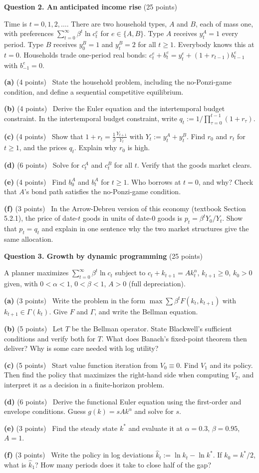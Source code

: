\documentclass[12pt]{article}
\newcommand{\gap}[1]{\par\vspace{#1}}
\newcommand{\qp}[2]{\par\medskip\textbf{(#1)} (#2 points)\ }
\begin{document}
\gap{6.0cm}
\newpage
\textbf{Question 2. An anticipated income rise} (25 points)

Time is $t=0,1,2,\dots$. There are two household types, $A$ and $B$, each
of mass one, with preferences $\sum_{t=0}^\infty\beta^t\ln c^e_t$ for
$e\in\{A,B\}$. Type $A$ receives $y^A_t=1$ every period. Type $B$ receives
$y^B_0=1$ and $y^B_t=2$ for all $t\ge1$. Everybody knows this at $t=0$.
Households trade one-period real bonds: $c^e_t+b^e_t=y^e_t+(1+r_{t-1})b^e_{t-1}$
with $b^e_{-1}=0$.

\needspace{8.5cm}
\qp{a}{4} State the household problem, including the no-Ponzi-game
condition, and define a sequential competitive equilibrium.
\gap{6.0cm}
\needspace{8.5cm}
\qp{b}{4} Derive the Euler equation and the intertemporal budget
constraint. In the intertemporal budget constraint, write
$q_t:=1/\prod_{\tau=0}^{t-1}(1+r_\tau)$.
\gap{6.0cm}
\needspace{8.5cm}
\qp{c}{4} Show that $1+r_t=\frac1\beta\frac{Y_{t+1}}{Y_t}$ with
$Y_t:=y^A_t+y^B_t$. Find $r_0$ and $r_t$ for $t\ge1$, and the prices $q_t$.
Explain why $r_0$ is high.
\gap{6.0cm}
\needspace{11.5cm}
\qp{d}{6} Solve for $c^A_t$ and $c^B_t$ for all $t$. Verify that the
goods market clears.
\gap{9.0cm}
\needspace{8.5cm}
\qp{e}{4} Find $b^A_0$ and $b^A_t$ for $t\ge1$. Who borrows at $t=0$,
and why? Check that $A$'s bond path satisfies the no-Ponzi-game
condition.
\gap{6.0cm}
\needspace{7.0cm}
\qp{f}{3} In the Arrow-Debreu version of this economy (textbook
Section 5.2.1), the price of date-$t$ goods in units of date-0 goods is
$p_t=\beta^tY_0/Y_t$. Show that $p_t=q_t$ and explain in one sentence why
the two market structures give the same allocation.

\gap{4.5cm}
\newpage
\textbf{Question 3. Growth by dynamic programming} (25 points)

A planner maximizes $\sum_{t=0}^\infty\beta^t\ln c_t$ subject to
$c_t+k_{t+1}=Ak_t^\alpha$, $k_{t+1}\ge0$, $k_0>0$ given, with
$0<\alpha<1$, $0<\beta<1$, $A>0$ (full depreciation).

\needspace{7.0cm}
\qp{a}{3} Write the problem in the form
$\max\sum\beta^tF(k_t,k_{t+1})$ with $k_{t+1}\in\Gamma(k_t)$. Give $F$ and
$\Gamma$, and write the Bellman equation.
\gap{4.5cm}
\needspace{10.0cm}
\qp{b}{5} Let $T$ be the Bellman operator. State Blackwell's sufficient
conditions and verify both for $T$. What does Banach's fixed-point theorem
then deliver? Why is some care needed with log utility?
\gap{7.5cm}
\needspace{10.0cm}
\qp{c}{5} Start value function iteration from $V_0\equiv0$. Find $V_1$
and its policy. Then find the policy that maximizes the right-hand side
when computing $V_2$, and interpret it as a decision in a finite-horizon
problem.
\gap{7.5cm}
\needspace{11.5cm}
\qp{d}{6} Derive the functional Euler equation using the first-order and
envelope conditions. Guess $g(k)=sAk^\alpha$ and solve for $s$.
\gap{9.0cm}
\needspace{7.0cm}
\qp{e}{3} Find the steady state $k^*$ and evaluate it at $\alpha=0.3$,
$\beta=0.95$, $A=1$.
\gap{4.5cm}
\needspace{7.0cm}
\qp{f}{3} Write the policy in log deviations
$\hat k_t:=\ln k_t-\ln k^*$. If $k_0=k^*/2$, what is $\hat k_1$? How many
periods does it take to close half of the gap?
\end{document}
